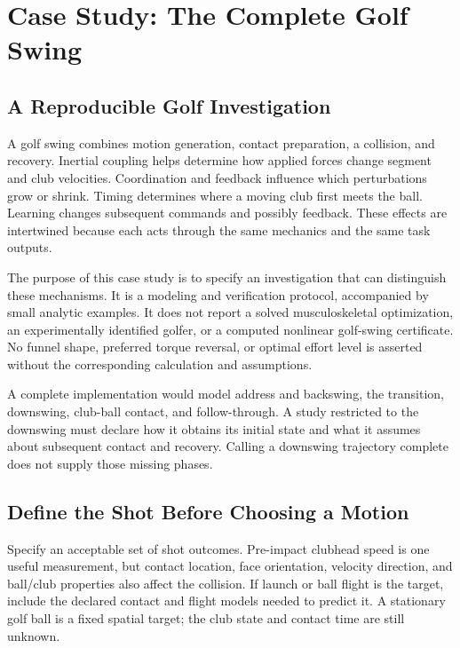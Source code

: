 \chapter{Case Study: The Complete Golf Swing}
\label{ch:case_study_golf_swing}
\begingroup
\raggedbottom
{}

\section{A Reproducible Golf Investigation}

A golf swing combines motion generation, contact preparation, a collision, and recovery. Inertial coupling helps determine how applied forces change segment and club velocities. Coordination and feedback influence which perturbations grow or shrink. Timing determines where a moving club first meets the ball. Learning changes subsequent commands and possibly feedback. These effects are intertwined because each acts through the same mechanics and the same task outputs.

The purpose of this case study is to specify an investigation that can distinguish these mechanisms. It is a modeling and verification protocol, accompanied by small analytic examples. It does not report a solved musculoskeletal optimization, an experimentally identified golfer, or a computed nonlinear golf-swing certificate. No funnel shape, preferred torque reversal, or optimal effort level is asserted without the corresponding calculation and assumptions.

A complete implementation would model address and backswing, the transition, downswing, club-ball contact, and follow-through. A study restricted to the downswing must declare how it obtains its initial state and what it assumes about subsequent contact and recovery. Calling a downswing trajectory complete does not supply those missing phases.

\section{Define the Shot Before Choosing a Motion}

Specify an acceptable set of shot outcomes. Pre-impact clubhead speed is one useful measurement, but contact location, face orientation, velocity direction, and ball/club properties also affect the collision. If launch or ball flight is the target, include the declared contact and flight models needed to predict it. A stationary golf ball is a fixed spatial target; the club state and contact time are still unknown.

